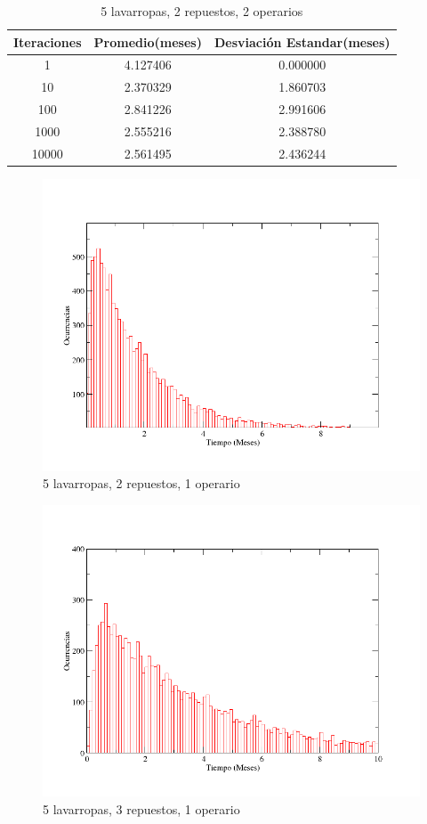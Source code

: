 \documentclass[10pt,a4paper]{article}
\begin{document}
\begin{table}[ht]
\caption{5 lavarropas, 2 repuestos, 2 operarios}
\centering
\begin{tabular}{c c c}
\hline\hline
Iteraciones & Promedio(meses) & Desviaci\'on Estandar(meses) \\ [0.5ex]
\hline
1 & 4.127406 & 0.000000\\
10 & 2.370329 & 1.860703\\
100 & 2.841226 & 2.991606\\
1000 & 2.555216 & 2.388780\\
10000 & 2.561495 & 2.436244\\
\hline
\end{tabular}
\end{table}

\begin{figure}
  \centering
  \includegraphics[scale=0.45]{5-2-1.png} 
  \caption{5 lavarropas, 2 repuestos, 1 operario}
  \label{sim:1}
\end{figure}

\begin{figure}
  \centering
  \includegraphics[scale=0.45]{5-3-1.png} 
  \caption{5 lavarropas, 3 repuestos, 1 operario}
  \label{sim:2}
\end{figure}
\end{document}
